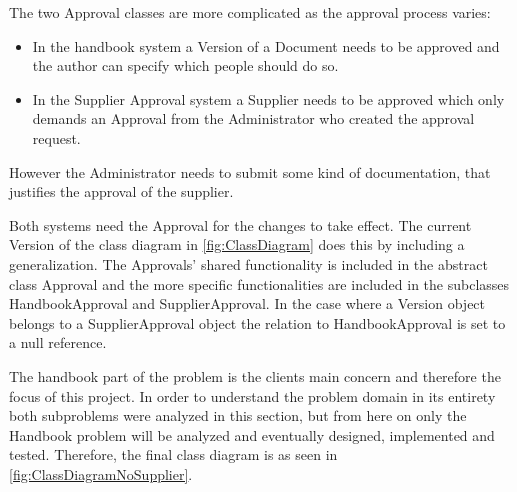 \documentclass[../../master.tex]{subfiles}
\begin{document}
The two Approval classes are more complicated as the approval process varies:
\begin{itemize}
  \item In the handbook system a Version of a Document needs to be approved and the author can specify which people should do so.
  \item In the Supplier Approval system a Supplier needs to be approved which only demands an Approval from the Administrator who created the approval request.
\end{itemize}

However the Administrator needs to submit some kind of documentation, that justifies the approval of the supplier.

Both systems need the Approval for the changes to take effect.
The current Version of the class diagram in \cref{fig:ClassDiagram} does this by including a generalization. The Approvals' shared functionality is included in the abstract class Approval and the more specific functionalities are included in the subclasses HandbookApproval and SupplierApproval.
In the case where a Version object belongs to a SupplierApproval object the relation to HandbookApproval is set to a null reference.


The handbook part of the problem is the clients main concern and therefore the focus of this project.
In order to understand the problem domain in its entirety both subproblems were analyzed in this section, but from here on  only the Handbook problem will be analyzed and eventually designed, implemented and tested.
Therefore, the final class diagram is as seen in \cref{fig:ClassDiagramNoSupplier}.
\end{document}
